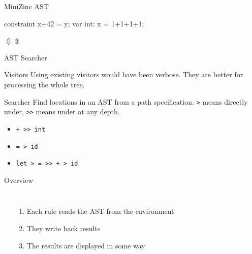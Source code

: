 \documentclass[aspectratio=169]{beamer} %
\begin{document}
\begin{frame}[fragile,label=mznast]{MiniZinc AST}
  \begin{mznno}
   constraint x+42 = y;       var int: x = 1+1+1+1;
 \end{mznno}
 \hspace{2.75cm}$\Updownarrow$\hspace{6.3cm}$\Updownarrow$
 \bigskip
 \newif\ifshowastnumbers\showastnumbersfalse
 
\end{frame}

\begin{frame}{AST Searcher}
  \begin{block}{Visitors}
    Using existing visitors would have been \alert{verbose}. They are better for processing the whole tree.
  \end{block}

  \pause
  \begin{block}{Searcher}
    Find locations in an AST from a path specification.\pause{}
    \texttt{>} means directly under, \texttt{>{}>} means under at any depth.
    \begin{itemize}
      \item \texttt{+ >{}> int}\pause
      \item \texttt{= > id}\pause
      \item \texttt{let > = >{}> + > id}
    \end{itemize}
  \end{block}
\end{frame}


\begin{frame}{Overview}
  \begin{columns}
    \begin{center}
      
    \end{center}

    \pause
    \begin{enumerate}
      \item Each rule reads the AST from the environment\pause
      \item They write back results\pause
      \item The results are displayed in some way
    \end{enumerate}
  \end{columns}
\end{frame}
\end{document}
